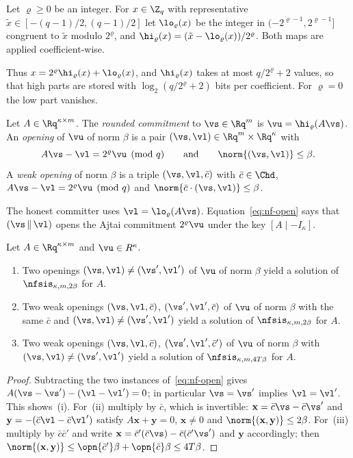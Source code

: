 \begin{definition}\label{def:hilo}
Let $\varrho\ge0$ be an integer. For $x\in\Z_q$ with representative $\tilde x\in[-(q-1)/2,(q-1)/2]$ let $\lo_\varrho(x)$ be the integer in $(-2^{\varrho-1},2^{\varrho-1}]$ congruent to $\tilde x$ modulo $2^\varrho$, and $\hi_\varrho(x)=(\tilde x-\lo_\varrho(x))/2^\varrho$. Both maps are applied coefficient-wise.
\end{definition}

Thus $x=2^\varrho\hi_\varrho(x)+\lo_\varrho(x)$, and $\hi_\varrho(x)$ takes at most $q/2^\varrho+2$ values, so that high parts are stored with $\log_2(q/2^\varrho+2)$ bits per coefficient. For $\varrho=0$ the low part vanishes.

\begin{definition}\label{def:rcom}
Let $A\in\Rq^{\kappa\times m}$. The \emph{rounded commitment} to $\vs\in\Rq^m$ is $\vu=\hi_\varrho(A\vs)$. An \emph{opening} of $\vu$ of norm $\beta$ is a pair $(\vs,\vl)\in\Rq^m\times\Rq^\kappa$ with
\begin{equation}\label{eq:nf-open}
A\vs-\vl=2^\varrho\vu\pmod q\qquad\text{and}\qquad\norm{(\vs,\vl)}\le\beta .
\end{equation}
A \emph{weak opening} of norm $\beta$ is a triple $(\vs,\vl,\bar c)$ with $\bar c\in\Chd$, $A\vs-\vl=2^\varrho\vu\pmod q$ and $\norm{\bar c\cdot(\vs,\vl)}\le\beta$.
\end{definition}

The honest committer uses $\vl=\lo_\varrho(A\vs)$. Equation~\eqref{eq:nf-open} says that $(\vs\,\|\,\vl)$ opens the Ajtai commitment $2^\varrho\vu$ under the key $[A\mid-I_\kappa]$.

\begin{lemma}[binding]\label{lem:binding}
Let $A\in\Rq^{\kappa\times m}$ and $\vu\in R^\kappa$.
\begin{enumerate}[label=(\roman*)]
\item Two openings $(\vs,\vl)\ne(\vs',\vl')$ of $\vu$ of norm $\beta$ yield a solution of $\nfsis_{\kappa,m,2\beta}$ for $A$.
\item Two weak openings $(\vs,\vl,\bar c)$, $(\vs',\vl',\bar c)$ of $\vu$ of norm $\beta$ with the same $\bar c$ and $(\vs,\vl)\ne(\vs',\vl')$ yield a solution of $\nfsis_{\kappa,m,2\beta}$ for $A$.
\item Two weak openings $(\vs,\vl,\bar c)$, $(\vs',\vl',\bar c')$ of $\vu$ of norm $\beta$ with $(\vs,\vl)\ne(\vs',\vl')$ yield a solution of $\nfsis_{\kappa,m,4T\beta}$ for $A$.
\end{enumerate}
\end{lemma}
\begin{proof}
Subtracting the two instances of~\eqref{eq:nf-open} gives $A(\vs-\vs')-(\vl-\vl')=0$; in particular $\vs=\vs'$ implies $\vl=\vl'$. This shows~(i). For~(ii) multiply by $\bar c$, which is invertible: $\mathbf x=\bar c\vs-\bar c\vs'$ and $\mathbf y=-(\bar c\vl-\bar c\vl')$ satisfy $A\mathbf x+\mathbf y=0$, $\mathbf x\ne0$ and $\norm{(\mathbf x,\mathbf y)}\le2\beta$. For~(iii) multiply by $\bar c\bar c'$ and write $\mathbf x=\bar c'(\bar c\vs)-\bar c(\bar c'\vs')$ and $\mathbf y$ accordingly; then $\norm{(\mathbf x,\mathbf y)}\le\opn{\bar c'}\beta+\opn{\bar c}\beta\le4T\beta$.
\end{proof}

